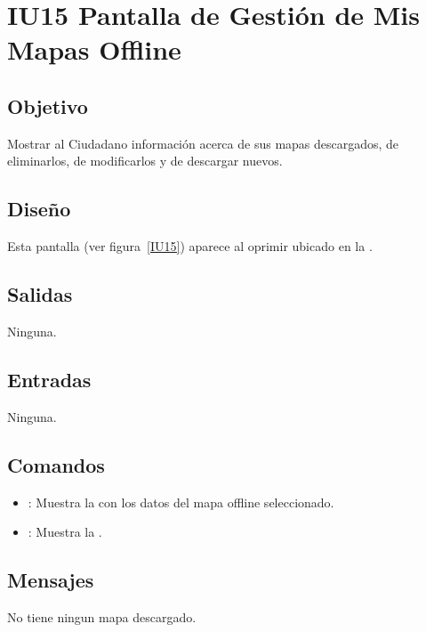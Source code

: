 \section{IU15 Pantalla de Gestión de Mis Mapas Offline}

\subsection{Objetivo}
	Mostrar al Ciudadano información acerca de sus mapas descargados, de eliminarlos, de modificarlos y de descargar nuevos.

\subsection{Diseño}
	Esta pantalla  (ver figura~\ref{IU15}) aparece al oprimir  ubicado en la .
	

\subsection{Salidas}

	Ninguna.

\subsection{Entradas}
	Ninguna.

\subsection{Comandos}
\begin{itemize}
	\item {}: Muestra la  con los datos del mapa offline seleccionado.
	\item {}: Muestra la .
\end{itemize}

\subsection{Mensajes}

\begin{Citemize}
	\item No tiene ningun mapa descargado.
\end{Citemize}

\clearpage
